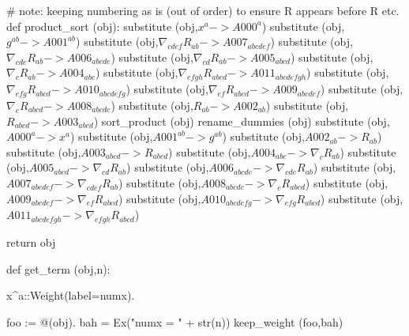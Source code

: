 \documentclass[12pt]{cdblatex}
\begin{document}
\begin{cadabra}
   # note: keeping numbering as is (out of order) to ensure R appears before \nabla R etc.
   def product_sort (obj):
       substitute (obj,$ x^{a}                            -> A000^{a}               $)
       substitute (obj,$ g^{a b}                          -> A001^{a b}             $)
       substitute (obj,$ \nabla_{c d e f}{R_{a b}}        -> A007_{a b c d e f}     $)
       substitute (obj,$ \nabla_{c d e}{R_{a b}}          -> A006_{a b c d e}       $)
       substitute (obj,$ \nabla_{c d}{R_{a b}}            -> A005_{a b c d}         $)
       substitute (obj,$ \nabla_{c}{R_{a b}}              -> A004_{a b c}           $)
       substitute (obj,$ \nabla_{e f g h}{R_{a b c d}}    -> A011_{a b c d e f g h} $)
       substitute (obj,$ \nabla_{e f g}{R_{a b c d}}      -> A010_{a b c d e f g}   $)
       substitute (obj,$ \nabla_{e f}{R_{a b c d}}        -> A009_{a b c d e f}     $)
       substitute (obj,$ \nabla_{e}{R_{a b c d}}          -> A008_{a b c d e}       $)
       substitute (obj,$ R_{a b}                          -> A002_{a b}             $)
       substitute (obj,$ R_{a b c d}                      -> A003_{a b c d}         $)
       sort_product   (obj)
       rename_dummies (obj)
       substitute (obj,$ A000^{a}                 -> x^{a}                          $)
       substitute (obj,$ A001^{a b}               -> g^{a b}                        $)
       substitute (obj,$ A002_{a b}               -> R_{a b}                        $)
       substitute (obj,$ A003_{a b c d}           -> R_{a b c d}                    $)
       substitute (obj,$ A004_{a b c}             -> \nabla_{c}{R_{a b}}            $)
       substitute (obj,$ A005_{a b c d}           -> \nabla_{c d}{R_{a b}}          $)
       substitute (obj,$ A006_{a b c d e}         -> \nabla_{c d e}{R_{a b}}        $)
       substitute (obj,$ A007_{a b c d e f}       -> \nabla_{c d e f}{R_{a b}}      $)
       substitute (obj,$ A008_{a b c d e}         -> \nabla_{e}{R_{a b c d}}        $)
       substitute (obj,$ A009_{a b c d e f}       -> \nabla_{e f}{R_{a b c d}}      $)
       substitute (obj,$ A010_{a b c d e f g}     -> \nabla_{e f g}{R_{a b c d}}    $)
       substitute (obj,$ A011_{a b c d e f g h}   -> \nabla_{e f g h}{R_{a b c d}}  $)

       return obj

   def get_term (obj,n):

       x^{a}::Weight(label=numx).

       foo := @(obj).
       bah  = Ex("numx = " + str(n))
       keep_weight (foo,bah)


\end{cadabra}
\end{document}
